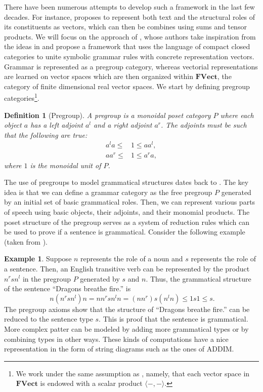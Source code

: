 \documentclass[11pt,a4paper,openright,twoside]{report}
\newcounter{mycounter}
\theoremstyle{plain}
\newtheorem{definition}[mycounter]{Definition}
\theoremstyle{definition}
\newtheorem{example}[mycounter]{Example}
\newcommand\dblquote[1]{\textquotedblleft #1\textquotedblright}
\begin{document}
There have been numerous attempts to develop such a framework in the last few decades. For instance, \cite{clark2007combining} proposes to represent both text and the structural roles of its constituents as vectors, which can then be combines using sums and tensor products. We will focus on the approach of \cite{coecke2010mathematical}, whose authors take inspiration from the ideas in \cite{clark2007combining} and propose a framework that uses the language of compact closed categories to unite symbolic grammar rules with concrete representation vectors. Grammar is represented as a pregroup category, whereas vectorial representations are learned on vector spaces which are then organized within $\mathbf{FVect}$, the category of finite dimensional real vector spaces. We start by defining pregroup categories\footnote{We work under the same assumption as \cite{coecke2010mathematical}, namely, that each vector space in $\mathbf{FVect}$ is endowed with a scalar product $\langle-,-\rangle$.}.

\begin{definition}[Pregroup]
  A pregroup is a monoidal poset category $P$ where each object $a$ has a left adjoint $a^l$ and a right adjoint $a^r$. The adjoints must be such that the following are true:
  \begin{align*}
    a^la \leq &1 \leq aa^l,\\
    aa^r \leq &1 \leq a^ra,
  \end{align*}
  where $1$ is the monoidal unit of $P$.
\end{definition}

The use of pregroups to model grammatical structures dates back to \cite{lambek1999type}. The key idea is that we can define a grammar category as the free pregroup $P$ generated by an initial set of basic grammatical roles. Then, we can represent various parts of speech using basic objects, their adjoints, and their monomial products. The poset structure of the pregroup serves as a system of reduction rules which can be used to prove if a sentence is grammatical. Consider the following example (taken from \cite{lewis2019compositionality}).


\begin{example}
  Suppose $n$ represents the role of a noun and $s$ represents the role of a sentence. Then, an English transitive verb can be represented by the product $n^rsn^l$ in the pregroup $P$ generated by $s$ and $n$. Thus, the grammatical structure of the sentence \dblquote{Dragons breathe fire.} is
  \begin{equation}\
    \label{eq: grammreduction}
    n(n^rsn^l)n = nn^rsn^ln = (nn^r)s(n^ln) \leq 1s1 \leq s.
  \end{equation}
  The pregroup axioms show that the structure of  \dblquote{Dragons breathe fire.} can be reduced to the sentence type $s$. This is proof that the sentence is grammatical. More complex patter can be modeled by adding more grammatical types or by combining types in other ways. These kinds of computations have a nice representation in the form of string diagrams such as the ones of ADDIM.
\end{example}
\end{document}
